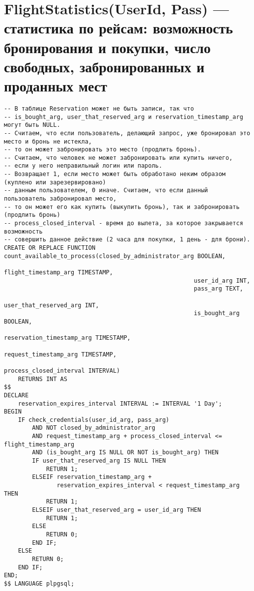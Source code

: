 \documentclass{article}
\begin{document}
\section{FlightStatistics(UserId, Pass) — статистика по рейсам: возможность бронирования и покупки, число свободных, забронированных и проданных мест}

\begin{verbatim}
-- В таблице Reservation может не быть записи, так что
-- is_bought_arg, user_that_reserved_arg и reservation_timestamp_arg могут быть NULL.
-- Считаем, что если пользователь, делающий запрос, уже бронировал это место и бронь не истекла,
-- то он может забронировать это место (продлить бронь).
-- Считаем, что человек не может забронировать или купить ничего,
-- если у него неправильный логин или пароль.
-- Возвращает 1, если место может быть обработано неким образом (куплено или зарезервировано)
-- данным пользователем, 0 иначе. Считаем, что если данный пользователь забронировал место,
-- то он может его как купить (выкупить бронь), так и забронировать (продлить бронь)
-- process_closed_interval - время до вылета, за которое закрывается возможность
-- совершить данное действие (2 часа для покупки, 1 день - для брони).
CREATE OR REPLACE FUNCTION count_available_to_process(closed_by_administrator_arg BOOLEAN,
                                                      flight_timestamp_arg TIMESTAMP,
                                                      user_id_arg INT,
                                                      pass_arg TEXT,
                                                      user_that_reserved_arg INT,
                                                      is_bought_arg BOOLEAN,
                                                      reservation_timestamp_arg TIMESTAMP,
                                                      request_timestamp_arg TIMESTAMP,
                                                      process_closed_interval INTERVAL)
    RETURNS INT AS
$$
DECLARE
    reservation_expires_interval INTERVAL := INTERVAL '1 Day';
BEGIN
    IF check_credentials(user_id_arg, pass_arg)
        AND NOT closed_by_administrator_arg
        AND request_timestamp_arg + process_closed_interval <= flight_timestamp_arg
        AND (is_bought_arg IS NULL OR NOT is_bought_arg) THEN
        IF user_that_reserved_arg IS NULL THEN
            RETURN 1;
        ELSEIF reservation_timestamp_arg +
               reservation_expires_interval < request_timestamp_arg THEN
            RETURN 1;
        ELSEIF user_that_reserved_arg = user_id_arg THEN
            RETURN 1;
        ELSE
            RETURN 0;
        END IF;
    ELSE
        RETURN 0;
    END IF;
END;
$$ LANGUAGE plpgsql;


\end{verbatim}
\end{document}
